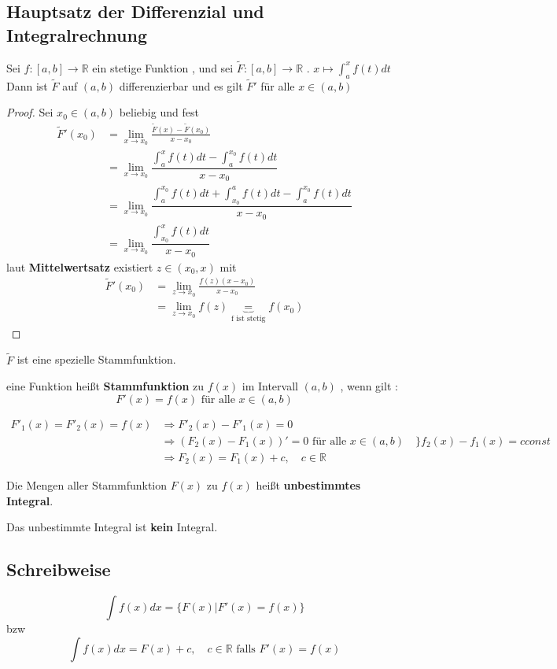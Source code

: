 \subsection{Hauptsatz der Differenzial und Integralrechnung }
Sei $ f : [a , b] \rightarrow \mathbb{R} $ ein stetige Funktion , und sei $ \widetilde{F} : [a , b] \rightarrow \mathbb{R	}$ . $ x \longmapsto \int_{a}^{x} f(t) dt $
Dann ist $\widetilde{F}$ auf $(a,b)$ differenzierbar  und es gilt $\widetilde{F}'$ für alle $x \in (a , b)$
\begin{proof}
Sei $x_0 \in (a,b)$ beliebig und fest 
\begin{align*}
\widetilde{F}'(x_0) &= \lim_{x \to x_0 }{\frac{\widetilde{F}(x)-\widetilde{F}(x_0)}{x - x_0}}\\
&= \lim_{x \to x_0 }{\dfrac{\int_{a}^{x} f(t) dt - \int_{a}^{x_0} f(t) dt}{x - x_0}}\\
&= \lim_{x \to x_0 }{\dfrac{\int_{a}^{x_0} f(t) dt + \int_{x_0}^{a} f(t) dt - \int_{a}^{x_0} f(t) dt}{x - x_0}}\\
&= \lim_{x \to x_0 }{\dfrac{\int_{x_0}^{x} f(t) dt}{x -x_0}}
\end{align*}
laut \textbf{Mittelwertsatz} existiert $z \in (x_0,x)$ mit
\begin{align*} 
 \widetilde{F}'(x_0) &= \lim_{ z \to x_0}{\frac{f(z)( x - x_0 )}{ x - x_0}}\\
&= \lim_{z \to x_0}{f(z)} \underbrace{=}_{\text{f ist stetig}} f(x_0) 
\end{align*}
\end{proof}
\begin{remark}
$\widetilde{F}$ ist eine spezielle Stammfunktion.
\end{remark}
\begin{definition}[Stammfunktion]
eine Funktion heißt \textbf{Stammfunktion} zu $f(x)$ im Intervall $(a , b)$ , wenn gilt :
\[ F'(x) = f(x) \text{ für alle } x \in (a , b) \]
\end{definition}
\begin{remark}
\begin{align*}
F'_1(x) = F'_2(x) = f(x) &\Rightarrow 
F'_2(x)-F'_1(x) = 0\\
&\Rightarrow (F_2(x) - F_1(x))'=0 \text{ für alle  } x \in (a,b) \quad \big\} f_2(x) - f_1(x) = c const\\
&\Rightarrow F_2(x) = F_1(x) + c , \quad c \in \mathbb{R}
\end{align*}
\end{remark}
\begin{definition}
Die Mengen aller Stammfunktion $F(x)$ zu $f(x)$ heißt \textbf{unbestimmtes Integral}.
\end{definition}
\begin{remark}
Das unbestimmte Integral ist \textbf{kein} Integral.\\
\subsection{Schreibweise}
\[ \int f(x)dx = \{ F(x) | F'(x) = f(x) \} \]
bzw
\[ \int {f(x)dx} = F(x) + c , \quad c \in \mathbb{R} \text{ falls  } F'(x) = f(x) \] 
\end{remark}
